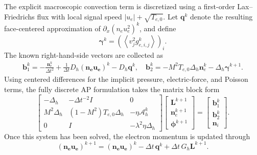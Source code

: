 \documentclass[pdflatex,final,10pt]{article}
\newcommand{\Del}[1]{#1}
\begin{document}
The explicit macroscopic convection term is discretized using a
first-order Lax--Friedrichs flux with local signal speed
$|u_e|+\sqrt{T_{e,0}}$. Let $\boldsymbol{q}^k$ denote the resulting
face-centered approximation of $\partial_x(n_eu_e^2)^k$, and define
\begin{equation*}
    \boldsymbol{\gamma}^k
    =
    \left(
        \left\langle v_j^2g_{e,i,j}^k\right\rangle
    \right)_i.
\end{equation*}
The known right-hand-side vectors are collected as
\Del{\begin{equation}
\begin{aligned}
    \boldsymbol{b}_1^k
    =
    -\frac{\boldsymbol{n}_e^k}{\Delta t^2}
    +\frac{1}{\Delta t}
    D_h\boldsymbol{(n_eu_e)}^k
    -D_h\boldsymbol{q}^k,\quad
    \boldsymbol{b}_2^k
    =
    -M^2T_{e,0}\Delta_h\boldsymbol{n}_e^k
    -\Delta_h\boldsymbol{\gamma}^{k+1}.
\end{aligned}
\label{eq:fully-discrete-rhs}
\end{equation}}
Using centered differences for the implicit pressure, electric-force, and
Poisson terms, the fully discrete AP formulation takes the \Del{matrix} block form
\begin{equation}
    \begin{bmatrix}
        -\Delta_h
        &
        -\Delta t^{-2}I
        &
        0
        \\[0.2em]
        M^2\Delta_h
        &
        (1-M^2)T_{e,0}\Delta_h
        &
        -\eta\mathcal{A}_h^k
        \\[0.2em]
        0
        &
        I
        &
        -\lambda^2\eta\Delta_h
    \end{bmatrix}
    \begin{bmatrix}
        \boldsymbol{L}^{k+1}\\
        \boldsymbol{n}_e^{k+1}\\
        \boldsymbol{\phi}^{k+1}
    \end{bmatrix}
    =
    \begin{bmatrix}
        \boldsymbol{b}_1^k\\
        \boldsymbol{b}_2^k\\
        \boldsymbol{n}_i
    \end{bmatrix}.
    \label{eq:fully-discrete-block-system}
\end{equation}
Once this system has been solved, the electron momentum is updated through
\begin{equation}
    \boldsymbol{(n_eu_e)}^{k+1}
    =
    \boldsymbol{(n_eu_e)}^k
    -\Delta t\,\boldsymbol{q}^k
    +\Delta t\,G_h\boldsymbol{L}^{k+1}.
    \label{eq:fully-discrete-momentum}
\end{equation}
\end{document}
